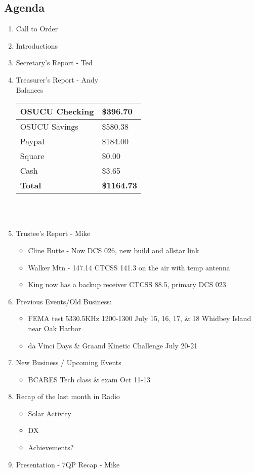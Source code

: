 \documentclass[letter,11pt]{extarticle}
\begin{document}
	\subsection*{Agenda}
	\begin{enumerate}
		\item Call to Order
		\item Introductions
		\item Secretary's Report - Ted
		\item Treasurer's Report - Andy \\
				Balances 
			\begin{tabular}{|l|l|} \hline
				OSUCU Checking & \$396.70 \\ \hline
				OSUCU Savings & \$580.38 \\ \hline
				Paypal & \$184.00 \\ \hline
				Square & \$0.00 \\ \hline
				Cash & \$3.65 \\ \hline
				\textbf{Total} & \textbf{\$1164.73} \\ \hline
			\end{tabular} \\ \\
		\item Trustee's Report - Mike
			\begin{itemize}
				\item Cline Butte - Now DCS 026, new build and allstar link
				\item Walker Mtn - 147.14 CTCSS 141.3 on the air with temp antenna
				\item King now has a backup receiver CTCSS 88.5, primary DCS 023
			\end{itemize}
		\item Previous Events/Old Business:
		\begin{itemize}
				\item FEMA test 5330.5KHz 1200-1300 July 15, 16, 17, \& 18 Whidbey Island near Oak Harbor
				\item da Vinci Days \& Graand Kinetic Challenge July 20-21
		\end{itemize}
			
		\item  New Business / Upcoming Events
			\begin{itemize}
				\item BCARES Tech class \& exam Oct 11-13
			\end{itemize}
		\item Recap of the last month in Radio
			\begin{itemize}
				\item Solar Activity
				\item DX
				\item Achievements?
			\end{itemize}
		\item  Presentation - 7QP Recap - Mike


\end{enumerate}
\end{document}
